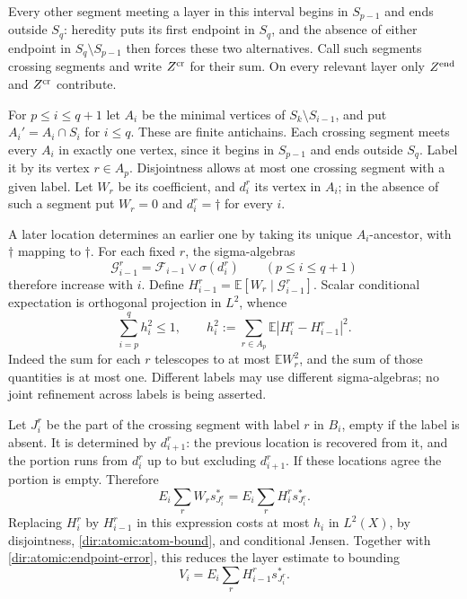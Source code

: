 Every other segment meeting a layer in this interval begins in
$S_{p-1}$ and ends outside $S_q$: heredity puts its first endpoint in
$S_q$, and the absence of either endpoint in $S_q\setminus S_{p-1}$
then forces these two alternatives.  Call such segments crossing
segments and write $Z^{\rm cr}$ for their sum.  On every relevant layer
only $Z^{\rm end}$ and $Z^{\rm cr}$ contribute.

For $p\le i\le q+1$ let $A_i$ be the minimal vertices of
$S_k\setminus S_{i-1}$, and put $A_i'=A_i\cap S_i$ for $i\le q$.
These are finite antichains.  Each crossing segment meets every $A_i$
in exactly one vertex, since it begins in $S_{p-1}$ and ends outside
$S_q$.  Label it by its vertex $r\in A_p$.  Disjointness allows at most
one crossing segment with a given label.  Let $W_r$ be its coefficient,
and $d_i^r$ its vertex in $A_i$; in the absence of such a segment put
$W_r=0$ and $d_i^r=\dagger$ for every $i$.

A later location determines an earlier one by taking its unique
$A_i$-ancestor, with $\dagger$ mapping to $\dagger$.  For each fixed
$r$, the sigma-algebras
\[
 \mathcal G_{i-1}^r=\mathcal F_{i-1}\vee\sigma(d_i^r)
 \qquad(p\le i\le q+1)
\]
therefore increase with $i$.  Define $H_{i-1}^r=\mathbb E[W_r\mid
\mathcal G_{i-1}^r]$.  Scalar conditional expectation is orthogonal
projection in $L^2$, whence
\begin{equation}\label{dir:atomic:crossing-energy}
 \sum_{i=p}^q h_i^2\le1,\qquad
 h_i^2:=\sum_{r\in A_p}\mathbb E|H_i^r-H_{i-1}^r|^2.
\end{equation}
Indeed the sum for each $r$ telescopes to at most $\mathbb E W_r^2$,
and the sum of those quantities is at most one.  Different labels may
use different sigma-algebras; no joint refinement across labels is
being asserted.

Let $J_i^r$ be the part of the crossing segment with label $r$ in $B_i$,
empty if the label is absent.  It is determined by $d_{i+1}^r$: the
previous location is recovered from it, and the portion runs from
$d_i^r$ up to but excluding $d_{i+1}^r$.  If these locations agree the
portion is empty.  Therefore
\[
 E_i\sum_r W_r s_{J_i^r}^*=E_i\sum_r H_i^r s_{J_i^r}^*.
\]
Replacing $H_i^r$ by $H_{i-1}^r$ in this expression costs at most $h_i$
in $L^2(X)$, by disjointness, \eqref{dir:atomic:atom-bound}, and
conditional Jensen.  Together with \eqref{dir:atomic:endpoint-error},
this reduces the layer estimate to bounding
\[
 V_i=E_i\sum_r H_{i-1}^r s_{J_i^r}^*.
\]

